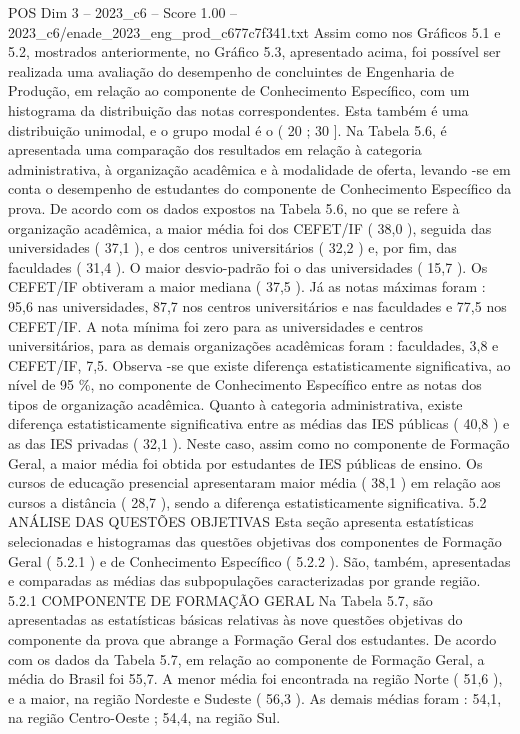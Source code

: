 \begin{textsample}{POS Dim 3 – 2023\_c6 – Score 1.00 – 2023\_c6/enade\_2023\_eng\_prod\_c677c7f341.txt}
Assim como nos Gráficos 5.1 e 5.2, mostrados anteriormente, no Gráfico 5.3, apresentado acima, foi possível ser realizada uma avaliação do desempenho de concluintes de Engenharia de Produção, em relação ao componente de Conhecimento Específico, com um histograma da distribuição das notas correspondentes.
Esta também é uma distribuição unimodal, e o grupo modal é o ( 20 ; 30 ].
Na Tabela 5.6, é apresentada uma comparação dos resultados em relação à categoria administrativa, à organização acadêmica e à modalidade de oferta, levando -se em conta o desempenho de estudantes do componente de Conhecimento Específico da prova.
De acordo com os dados expostos na Tabela 5.6, no que se refere à organização acadêmica, a maior média foi dos CEFET/IF ( 38,0 ), seguida das universidades ( 37,1 ), e dos centros universitários ( 32,2 ) e, por fim, das faculdades ( 31,4 ).
O maior desvio-padrão foi o das universidades ( 15,7 ).
Os CEFET/IF obtiveram a maior mediana ( 37,5 ).
Já as notas máximas foram : 95,6 nas universidades, 87,7 nos centros universitários e nas faculdades e 77,5 nos CEFET/IF.
A nota mínima foi zero para as universidades e centros universitários, para as demais organizações acadêmicas foram : faculdades, 3,8 e CEFET/IF, 7,5.
Observa -se que existe diferença estatisticamente significativa, ao nível de 95 \%, no componente de Conhecimento Específico entre as notas dos tipos de organização acadêmica.
Quanto à categoria administrativa, existe diferença estatisticamente significativa entre as médias das IES públicas ( 40,8 ) e as das IES privadas ( 32,1 ).
Neste caso, assim como no componente de Formação Geral, a maior média foi obtida por estudantes de IES públicas de ensino.
Os cursos de educação presencial apresentaram maior média ( 38,1 ) em relação aos cursos a distância ( 28,7 ), sendo a diferença estatisticamente significativa. 5.2 ANÁLISE DAS QUESTÕES OBJETIVAS Esta seção apresenta estatísticas selecionadas e histogramas das questões objetivas dos componentes de Formação Geral ( 5.2.1 ) e de Conhecimento Específico ( 5.2.2 ).
São, também, apresentadas e comparadas as médias das subpopulações caracterizadas por grande região. 5.2.1 COMPONENTE DE FORMAÇÃO GERAL Na Tabela 5.7, são apresentadas as estatísticas básicas relativas às nove questões objetivas do componente da prova que abrange a Formação Geral dos estudantes.
De acordo com os dados da Tabela 5.7, em relação ao componente de Formação Geral, a média do Brasil foi 55,7.
A menor média foi encontrada na região Norte ( 51,6 ), e a maior, na região Nordeste e Sudeste ( 56,3 ).
As demais médias foram : 54,1, na região Centro-Oeste ; 54,4, na região Sul.

\end{textsample}
